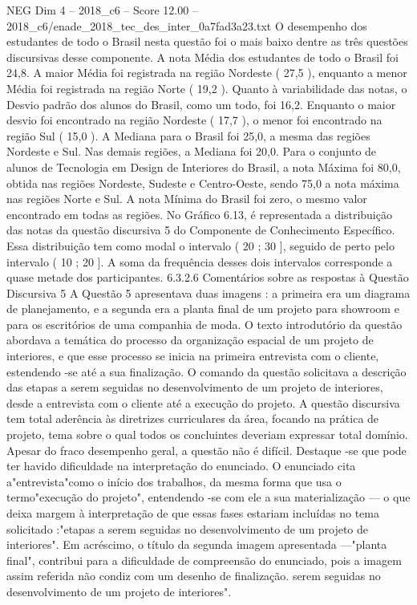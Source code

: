 \begin{textsample}{NEG Dim 4 – 2018\_c6 – Score 12.00 – 2018\_c6/enade\_2018\_tec\_des\_inter\_0a7fad3a23.txt}
O desempenho dos estudantes de todo o Brasil nesta questão foi o mais baixo dentre as três questões discursivas desse componente.
A nota Média dos estudantes de todo o Brasil foi 24,8.
A maior Média foi registrada na região Nordeste ( 27,5 ), enquanto a menor Média foi registrada na região Norte ( 19,2 ).
Quanto à variabilidade das notas, o Desvio padrão dos alunos do Brasil, como um todo, foi 16,2.
Enquanto o maior desvio foi encontrado na região Nordeste ( 17,7 ), o menor foi encontrado na região Sul ( 15,0 ).
A Mediana para o Brasil foi 25,0, a mesma das regiões Nordeste e Sul.
Nas demais regiões, a Mediana foi 20,0.
Para o conjunto de alunos de Tecnologia em Design de Interiores do Brasil, a nota Máxima foi 80,0, obtida nas regiões Nordeste, Sudeste e Centro-Oeste, sendo 75,0 a nota máxima nas regiões Norte e Sul.
A nota Mínima do Brasil foi zero, o mesmo valor encontrado em todas as regiões.
No Gráfico 6.13, é representada a distribuição das notas da questão discursiva 5 do Componente de Conhecimento Específico.
Essa distribuição tem como modal o intervalo ( 20 ; 30 ], seguido de perto pelo intervalo ( 10 ; 20 ].
A soma da frequência desses dois intervalos corresponde a quase metade dos participantes. 6.3.2.6 Comentários sobre as respostas à Questão Discursiva 5 A Questão 5 apresentava duas imagens : a primeira era um diagrama de planejamento, e a segunda era a planta final de um projeto para showroom e para os escritórios de uma companhia de moda.
O texto introdutório da questão abordava a temática do processo da organização espacial de um projeto de interiores, e que esse processo se inicia na primeira entrevista com o cliente, estendendo -se até a sua finalização.
O comando da questão solicitava a descrição das etapas a serem seguidas no desenvolvimento de um projeto de interiores, desde a entrevista com o cliente até a execução do projeto.
A questão discursiva tem total aderência às diretrizes curriculares da área, focando na prática de projeto, tema sobre o qual todos os concluintes deveriam expressar total domínio.
Apesar do fraco desempenho geral, a questão não é difícil.
Destaque -se que pode ter havido dificuldade na interpretação do enunciado.
O enunciado cita a"entrevista"como o início dos trabalhos, da mesma forma que usa o termo"execução do projeto", entendendo -se com ele a sua materialização — o que deixa margem à interpretação de que essas fases estariam incluídas no tema solicitado :"etapas a serem seguidas no desenvolvimento de um projeto de interiores".
Em acréscimo, o título da segunda imagem apresentada —"planta final", contribui para a dificuldade de compreensão do enunciado, pois a imagem assim referida não condiz com um desenho de finalização. serem seguidas no desenvolvimento de um projeto de interiores".

\end{textsample}
